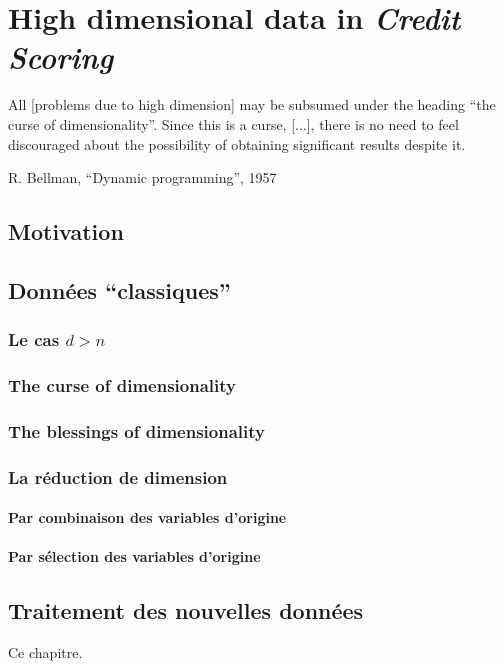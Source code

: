 \chapter{High dimensional data in \textit{Credit Scoring}} \label{chap7}

\epigraph{All [problems due to high dimension] may be subsumed under the heading “the curse of dimensionality”. Since this is a curse, [...], there is no need to feel discouraged about the possibility of obtaining significant results despite it.}{R. Bellman, ``Dynamic programming'', 1957}

\minitoc



\section{Motivation}



\section{Données ``classiques''}

\subsection{Le cas $d > n$}


\subsection{The curse of dimensionality}


\subsection{The blessings of dimensionality}


\subsection{La réduction de dimension}


\subsubsection{Par combinaison des variables d'origine}

\subsubsection{Par sélection des variables d'origine}


\section{Traitement des nouvelles données}

\bigskip

Ce chapitre.


\printbibliography[heading=subbibliography, title=Références du chapitre 6]